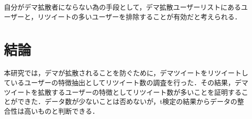 \documentclass[uplatex,twocolumn]{jsarticle}
\begin{document}
自分がデマ拡散者にならない為の手段として，デマ拡散ユーザーリストにあるユーザーと，リツイートの多いユーザーを排除することが有効だと考えられる．

\section{結論}
本研究では，デマが拡散されることを防ぐために，デマツイートをリツイートしているユーザーの特徴抽出としてリツイート数の調査を行った．その結果，デマツイートを拡散するユーザーの特徴としてリツイート数が多いことを証明することができた．データ数が少ないことは否めないが，t検定の結果からデータの整合性は高いものと判断できる．


\end{document}
